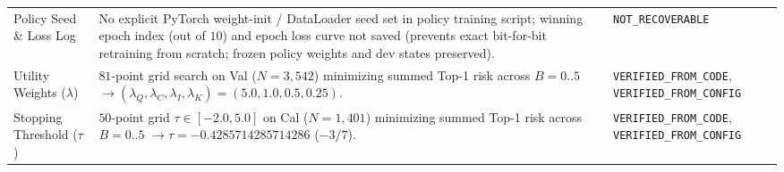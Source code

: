 \begin{table}[!htbp]
{\begin{tabular}{@{}p{2.7cm}p{6.6cm}p{4.8cm}@{}}
Policy Seed \& Loss Log & No explicit PyTorch weight-init / DataLoader seed set in policy training script; winning epoch index (out of $10$) and epoch loss curve not saved (prevents exact bit-for-bit retraining from scratch; frozen policy weights and dev states preserved). & \texttt{NOT\_RECOVERABLE} \\
Utility Weights ($\lambda$) & $81$-point grid search on Val ($N=3{,}542$) minimizing summed Top-1 risk across $B=0..5$ $\to (\lambda_Q,\lambda_C,\lambda_I,\lambda_K)=(5.0, 1.0, 0.5, 0.25)$. & \texttt{VERIFIED\_FROM\_CODE}, \texttt{VERIFIED\_FROM\_CONFIG} \\
Stopping Threshold ($\tau$) & $50$-point grid $\tau \in [-2.0, 5.0]$ on Cal ($N=1{,}401$) minimizing summed Top-1 risk across $B=0..5$ $\to \tau = -0.4285714285714286$ ($-3/7$). & \texttt{VERIFIED\_FROM\_CODE}, \texttt{VERIFIED\_FROM\_CONFIG} \\
\bottomrule
\end{tabular}%
}
\end{table}

